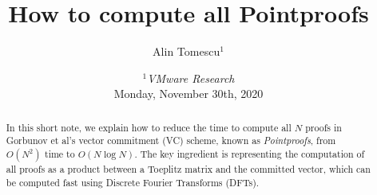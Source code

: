 \documentclass{llncs}
\title{\textbf{How to compute all Pointproofs}} %
\author{Alin Tomescu$^{1}$}
\date{%
{\small $^1$\textit{VMware Research}}\\[.5em]%
{\small Monday, November 30th, 2020}}
\author{}
\date{}                     %
\begin{document}
\maketitle

\ifEurocrypt
    \vspace{-5em}
\fi
\begin{abstract}
    In this short note, we explain how to reduce the time to compute all $N$ proofs in Gorbunov et al's vector commitment (VC) scheme, known as \textit{Pointproofs}, from $O(N^2)$ time to $O(N\log{N})$.
    The key ingredient is representing the computation of all proofs as a product between a Toeplitz matrix and the committed vector, which can be computed fast using Discrete Fourier Transforms (DFTs).
\end{abstract}








\ifEurocrypt
    
    {\footnotesize
    }
\else
    \clearpage
    
    
\fi


\ifNotEurocrypt
\fi
\end{document}
